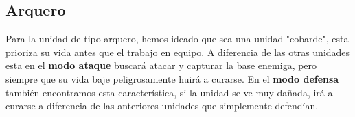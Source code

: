 \subsection{Arquero}
Para la unidad de tipo arquero, hemos ideado que sea una unidad "cobarde", esta prioriza su vida antes que el trabajo en equipo. A diferencia de las otras unidades esta en el \textbf{modo ataque} buscará atacar y capturar la base enemiga, pero siempre que su vida baje peligrosamente huirá a curarse. En el \textbf{modo defensa} también encontramos esta característica, si la unidad se ve muy dañada, irá a curarse a diferencia de las anteriores unidades que simplemente defendían.

\begin{figure}[H]
    \centering
\end{figure}
